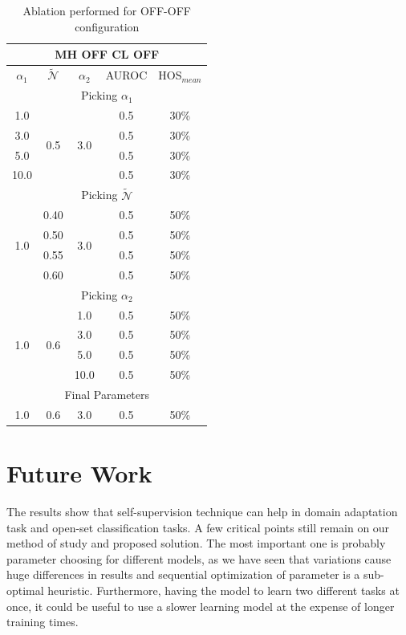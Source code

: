 \documentclass[10pt,twocolumn,letterpaper]{article}
\begin{document}
\begin{table}
  \centering
  \begin{tabular}[h]{||c|c|c||c|c||}
    \hline
    \multicolumn{5}{||c||}{MH OFF CL OFF} \\
    \hline
    $\alpha_1$ & $\mathcal{\tilde N}$ & $\alpha_2$  & AUROC & HOS$_{mean}$\\    
    \hline
    \hline
    \multicolumn{5}{||c||}{Picking $\alpha_1$} \\
    \hline
    1.0 & \multirow{4}{*}{0.5} & \multirow{4}{*}{3.0} & 0.5 & 30\% \\
    3.0 & & & 0.5 & 30\% \\
    5.0 & & & 0.5 & 30\% \\
    10.0 & & & 0.5 & 30\% \\
    \hline
    \hline
    \multicolumn{5}{||c||}{Picking $\mathcal{\tilde N}$} \\
    \hline
    \multirow{4}{*}{1.0} & 0.40 & \multirow{4}{*}{3.0} & 0.5 & 50\%\\
    & 0.50 && 0.5 & 50\% \\
    & 0.55 && 0.5 & 50\% \\
    & 0.60 && 0.5 & 50\% \\
    \hline
    \hline
    \multicolumn{5}{||c||}{Picking $\alpha_2$} \\
    \hline
    \multirow{4}{*}{1.0} & \multirow{4}{*}{0.6} & 1.0 & 0.5 & 50\%\\
    && 3.0 & 0.5 & 50\% \\
    && 5.0 & 0.5 & 50\% \\
    && 10.0 & 0.5 & 50\% \\
    \hline
    \hline
    \multicolumn{5}{||c||}{Final Parameters} \\
    \hline
    1.0 & 0.6 & 3.0 & 0.5 & 50\%\\
    \hline
  \end{tabular}
  \caption{\label{tab:ablationoffoff} Ablation performed for OFF-OFF configuration}
\end{table}
\section{Future Work}

The results show that self-supervision technique can help in domain adaptation task and open-set classification tasks.
A few critical points still remain on our method of study and proposed solution.
The most important one is probably parameter choosing for different models, as we have seen that variations cause huge differences in results and sequential optimization of parameter is a sub-optimal heuristic.
Furthermore, having the model to learn two different tasks at once, it could be useful to use a slower learning model at the expense of longer training times.

{\small


}
\end{document}
